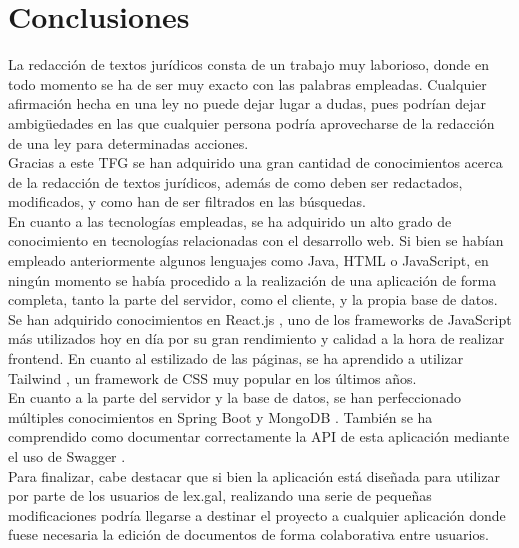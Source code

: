 \section{Conclusiones}

La redacción de textos jurídicos consta de un trabajo muy laborioso, donde en todo momento se ha de ser muy exacto con las palabras empleadas. Cualquier afirmación hecha en una ley no puede dejar lugar a dudas, pues podrían dejar ambigüedades en las que cualquier persona podría aprovecharse de la redacción de una ley para determinadas acciones.
\\

Gracias a este TFG se han adquirido una gran cantidad de conocimientos acerca de la redacción de textos jurídicos, además de como deben ser redactados, modificados, y como han de ser filtrados en las búsquedas.
\\

En cuanto a las tecnologías empleadas, se ha adquirido un alto grado de conocimiento en tecnologías relacionadas con el desarrollo web. Si bien se habían empleado anteriormente algunos lenguajes como Java, HTML o JavaScript, en ningún momento se había procedido a la realización de una aplicación de forma completa, tanto la parte del servidor, como el cliente, y la propia base de datos.
\\

Se han adquirido conocimientos en React.js \cite{react}, uno de los frameworks de JavaScript más utilizados hoy en día por su gran rendimiento y calidad a la hora de realizar frontend. En cuanto al estilizado de las páginas, se ha aprendido a utilizar Tailwind \cite{tailwind}, un framework de CSS muy popular en los últimos años.
\\

En cuanto a la parte del servidor y la base de datos, se han perfeccionado múltiples conocimientos en Spring Boot \cite{spring} y MongoDB \cite{mongodb}. También se ha comprendido como documentar correctamente la API de esta aplicación mediante el uso de Swagger \cite{swagger}.
\\

Para finalizar, cabe destacar que si bien la aplicación está diseñada para utilizar por parte de los usuarios de lex.gal, realizando una serie de pequeñas modificaciones podría llegarse a destinar el proyecto a cualquier aplicación donde fuese necesaria la edición de documentos de forma colaborativa entre usuarios.